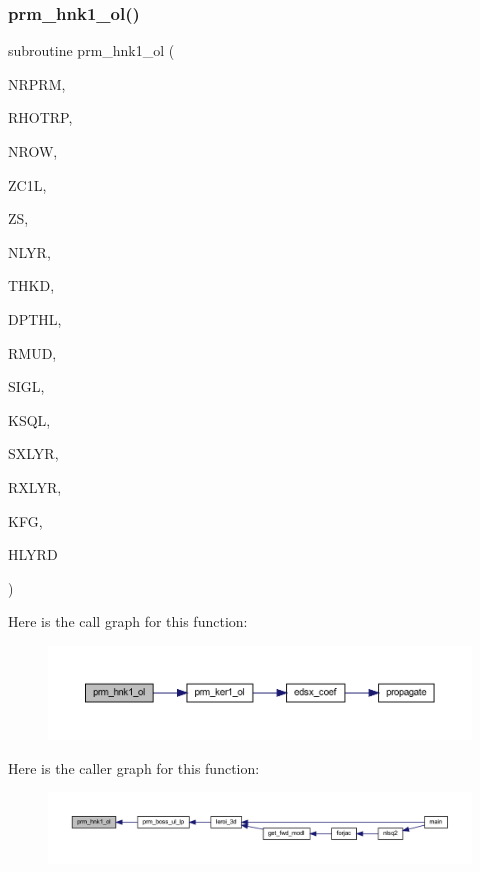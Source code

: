 \subsubsection{\texorpdfstring{prm\+\_\+hnk1\+\_\+ol()}{prm\_hnk1\_ol()}}
{\footnotesize\ttfamily subroutine prm\+\_\+hnk1\+\_\+ol (\begin{DoxyParamCaption}\item[{integer}]{N\+R\+P\+RM,  }\item[{real, dimension(nrprm)}]{R\+H\+O\+T\+RP,  }\item[{integer}]{N\+R\+OW,  }\item[{real, dimension(nrow)}]{Z\+C1L,  }\item[{real(kind=ql)}]{ZS,  }\item[{integer}]{N\+L\+YR,  }\item[{real(kind=ql), dimension (nlyr)}]{T\+H\+KD,  }\item[{real(kind=ql), dimension (nlyr)}]{D\+P\+T\+HL,  }\item[{real(kind=ql), dimension(0\+:nlyr)}]{R\+M\+UD,  }\item[{complex(kind=ql), dimension (nlyr)}]{S\+I\+GL,  }\item[{complex(kind=ql), dimension (nlyr)}]{K\+S\+QL,  }\item[{integer}]{S\+X\+L\+YR,  }\item[{integer}]{R\+X\+L\+YR,  }\item[{integer}]{K\+FG,  }\item[{complex(kind=ql), dimension(nrprm,3,nrow)}]{H\+L\+Y\+RD }\end{DoxyParamCaption})}

Here is the call graph for this function\+:\nopagebreak
\begin{figure}[H]
\begin{center}
\leavevmode
\includegraphics[width=350pt]{Leroi_8f90_addd341d907a00b743326c01025f01020_cgraph}
\end{center}
\end{figure}
Here is the caller graph for this function\+:\nopagebreak
\begin{figure}[H]
\begin{center}
\leavevmode
\includegraphics[width=350pt]{Leroi_8f90_addd341d907a00b743326c01025f01020_icgraph}
\end{center}
\end{figure}
\mbox{\label{Leroi_8f90_a677c57fa23bac760da7b8f845b3f9f9d}} 
